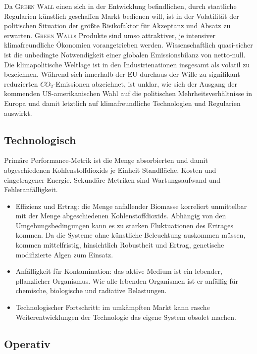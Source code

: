 Da \textsc{Green Wall} einen sich in der Entwicklung befindlichen, durch staatliche Regularien künstlich geschaffen Markt bedienen will, ist in der Volatilität der politischen Situation der größte Risikofaktor für Akzeptanz und Absatz zu erwarten.
\textsc{Green Wall}s Produkte sind umso attraktiver, je intensiver klimafreundliche Ökonomien vorangetrieben werden.
Wissenschaftlich quasi-sicher ist die unbedingte Notwendigkeit einer globalen Emissionsbilanz von netto-null.
Die klimapolitische Weltlage ist in den Industrienationen insgesamt als volatil zu bezeichnen.
Während sich innerhalb der EU durchaus der Wille zu signifikant reduzierten \(CO_2\)-Emissionen abzeichnet, ist unklar, wie sich der Ausgang der kommenden US-amerikanischen Wahl auf die politischen Mehrheitsverhältnisse in Europa und damit letztlich auf klimafreundliche Technologien und Regularien auswirkt.

\subsection{Technologisch}

Primäre Performance-Metrik ist die Menge absorbierten und damit abgeschiedenen Kohlenstoffdioxids je Einheit Standfläche, Kosten und eingetragener Energie.
Sekundäre Metriken sind Wartungsaufwand und Fehleranfälligkeit.
\begin{itemize}
    \item Effizienz und Ertrag: die Menge anfallender Biomasse korreliert unmittelbar mit der Menge abgeschiedenen Kohlenstoffdioxids.
          Abhängig von den Umgebungsbedingungen kann es zu starken Fluktuationen des Ertrages kommen.
          Da die Systeme ohne künstliche Beleuchtung auskommen müssen, kommen mittelfristig, hinsichtlich Robustheit und Ertrag, genetische modifizierte Algen zum Einsatz.
    \item Anfälligkeit für Kontamination: das aktive Medium ist ein lebender, pflanzlicher Organismus. Wie alle lebenden Organismen ist er anfällig für chemische, biologische und radiative Belastungen.
    \item Technologischer Fortschritt: im umkämpften Markt kann rasche Weiterentwicklungen der Technologie das eigene System obsolet machen.
\end{itemize}

\subsection{Operativ}

